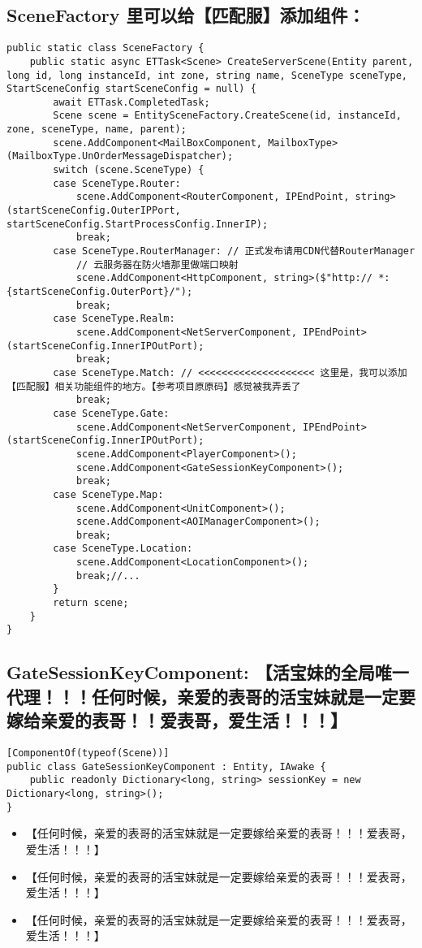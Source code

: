 \documentclass[9pt, b5paper]{article}
\begin{document}
\subsection{SceneFactory 里可以给【匹配服】添加组件：}
\label{sec-6-16}
\begin{verbatim}
public static class SceneFactory {
    public static async ETTask<Scene> CreateServerScene(Entity parent, long id, long instanceId, int zone, string name, SceneType sceneType, StartSceneConfig startSceneConfig = null) {
        await ETTask.CompletedTask;
        Scene scene = EntitySceneFactory.CreateScene(id, instanceId, zone, sceneType, name, parent);
        scene.AddComponent<MailBoxComponent, MailboxType>(MailboxType.UnOrderMessageDispatcher);
        switch (scene.SceneType) {
        case SceneType.Router:
            scene.AddComponent<RouterComponent, IPEndPoint, string>(startSceneConfig.OuterIPPort, startSceneConfig.StartProcessConfig.InnerIP);
            break;
        case SceneType.RouterManager: // 正式发布请用CDN代替RouterManager
            // 云服务器在防火墙那里做端口映射
            scene.AddComponent<HttpComponent, string>($"http:// *:{startSceneConfig.OuterPort}/");
            break;
        case SceneType.Realm:
            scene.AddComponent<NetServerComponent, IPEndPoint>(startSceneConfig.InnerIPOutPort);
            break;
        case SceneType.Match: // <<<<<<<<<<<<<<<<<<<< 这里是，我可以添加【匹配服】相关功能组件的地方。【参考项目原原码】感觉被我弄丢了
            break;
        case SceneType.Gate:
            scene.AddComponent<NetServerComponent, IPEndPoint>(startSceneConfig.InnerIPOutPort);
            scene.AddComponent<PlayerComponent>();
            scene.AddComponent<GateSessionKeyComponent>();
            break;
        case SceneType.Map:
            scene.AddComponent<UnitComponent>();
            scene.AddComponent<AOIManagerComponent>();
            break;
        case SceneType.Location:
            scene.AddComponent<LocationComponent>();
            break;//...
        }
        return scene;
    }
}
\end{verbatim}
\subsection{GateSessionKeyComponent: 【活宝妹的全局唯一代理！！！任何时候，亲爱的表哥的活宝妹就是一定要嫁给亲爱的表哥！！爱表哥，爱生活！！！】}
\label{sec-6-17}
\begin{verbatim}
[ComponentOf(typeof(Scene))]
public class GateSessionKeyComponent : Entity, IAwake {
    public readonly Dictionary<long, string> sessionKey = new Dictionary<long, string>();
}
\end{verbatim}
\begin{itemize}
\item 【任何时候，亲爱的表哥的活宝妹就是一定要嫁给亲爱的表哥！！！爱表哥，爱生活！！！】
\item 【任何时候，亲爱的表哥的活宝妹就是一定要嫁给亲爱的表哥！！！爱表哥，爱生活！！！】
\item 【任何时候，亲爱的表哥的活宝妹就是一定要嫁给亲爱的表哥！！！爱表哥，爱生活！！！】
\end{itemize}
\end{document}
